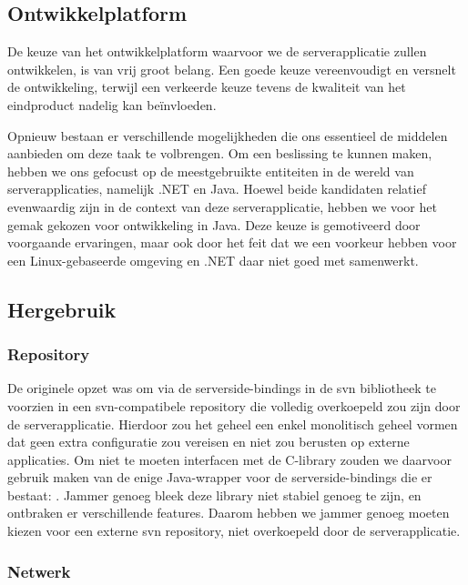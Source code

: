 \subsection{Ontwikkelplatform}

De keuze van het ontwikkelplatform waarvoor we de serverapplicatie zullen ontwikkelen, is van vrij groot belang. Een goede keuze vereenvoudigt en versnelt de ontwikkeling, terwijl een verkeerde keuze tevens de kwaliteit van het eindproduct nadelig kan beïnvloeden.

Opnieuw bestaan er verschillende mogelijkheden die ons essentieel de middelen aanbieden om deze taak te volbrengen. Om een beslissing te kunnen maken, hebben we ons gefocust op de meestgebruikte entiteiten in de wereld van serverapplicaties, namelijk .NET en Java. Hoewel beide kandidaten relatief evenwaardig zijn in de context van deze serverapplicatie, hebben we voor het gemak gekozen voor ontwikkeling in Java. Deze keuze is gemotiveerd door voorgaande ervaringen, maar ook door het feit dat we een voorkeur hebben voor een Linux-gebaseerde omgeving en .NET daar niet goed met samenwerkt.

\subsection{Hergebruik}

\subsubsection{Repository}

De originele opzet was om via de serverside-bindings in de \ac{svn} bibliotheek te voorzien in een \ac{svn}-compatibele repository die volledig overkoepeld zou zijn door de serverapplicatie. Hierdoor zou het geheel een enkel monolitisch geheel vormen dat geen extra configuratie zou vereisen en niet zou berusten op externe applicaties. Om niet te moeten interfacen met de C-library zouden we daarvoor gebruik maken van de enige Java-wrapper voor de serverside-bindings die er bestaat: . Jammer genoeg bleek deze library niet stabiel genoeg te zijn, en ontbraken er verschillende features. Daarom hebben we jammer genoeg moeten kiezen voor een externe \ac{svn} repository, niet overkoepeld door de serverapplicatie.

\subsubsection{Netwerk}

